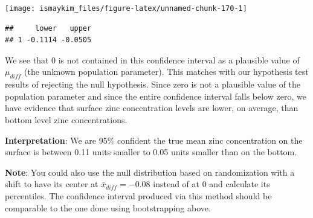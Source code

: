 \documentclass[]{tufte-book}
\newenvironment{Shaded}{\begin{snugshade}}{\end{snugshade}}
\newcommand{\KeywordTok}[1]{\textcolor[rgb]{0.13,0.29,0.53}{\textbf{{#1}}}}
\newcommand{\DataTypeTok}[1]{\textcolor[rgb]{0.13,0.29,0.53}{{#1}}}
\newcommand{\DecValTok}[1]{\textcolor[rgb]{0.00,0.00,0.81}{{#1}}}
\newcommand{\FloatTok}[1]{\textcolor[rgb]{0.00,0.00,0.81}{{#1}}}
\newcommand{\StringTok}[1]{\textcolor[rgb]{0.31,0.60,0.02}{{#1}}}
\newcommand{\NormalTok}[1]{{#1}}
\begin{document}
\begin{Shaded}
\end{Shaded}

\begin{center}\texttt{[image: ismaykim\_files/figure-latex/unnamed-chunk-170-1]} \end{center}

\begin{Shaded}
\end{Shaded}

\begin{verbatim}
##     lower   upper
## 1 -0.1114 -0.0505
\end{verbatim}

We see that 0 is not contained in this confidence interval as a
plausible value of \(\mu_{diff}\) (the unknown population parameter).
This matches with our hypothesis test results of rejecting the null
hypothesis. Since zero is not a plausible value of the population
parameter and since the entire confidence interval falls below zero, we
have evidence that surface zinc concentration levels are lower, on
average, than bottom level zinc concentrations.

\textbf{Interpretation}: We are 95\% confident the true mean zinc
concentration on the surface is between 0.11 units smaller to 0.05 units
smaller than on the bottom.

\textbf{Note}: You could also use the null distribution based on
randomization with a shift to have its center at
\(\bar{x}_{diff} = -0.08\) instead of at 0 and calculate its
percentiles. The confidence interval produced via this method should be
comparable to the one done using bootstrapping above.
\end{document}
